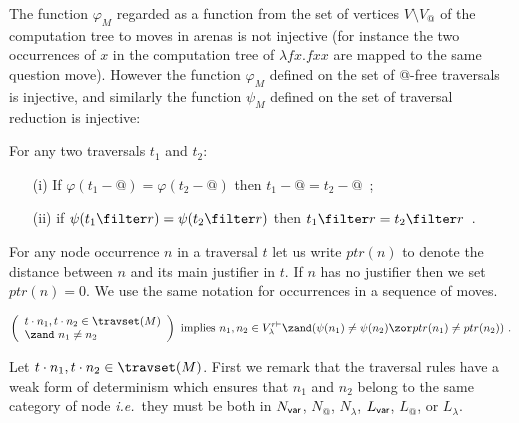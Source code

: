 The function $\varphi_M$ regarded as a function from the set of vertices $V \setminus V_@$ of the computation tree to moves in arenas is not injective (for instance the two occurrences of $x$ in the computation tree of $\lambda f x. f x x$ are mapped to the same question move). However the function $\varphi_M$ defined on the set of @-free traversals is injective, and similarly the function $\psi_M$ defined on the set of traversal reduction is injective:
\begin{lemma}
\label{lem:varphiinjective}
For any two traversals $t_1$ and $t_2$:
\begin{itemize}
\item[(i)] If $\varphi (t_1 - @ ) = \varphi (t_2 - @ )$ then $t_1-@ =t_2 -@$\ ;
\item[(ii)] if $\psi (t_1 \filter r ) = \psi (t_2 \filter r )$ then $t_1\filter r = t_2\filter r$\ .
\end{itemize}
\end{lemma}
For any node occurrence $n$ in a traversal $t$ let us write $ptr(n)$ to denote the distance between $n$ and its main justifier in $t$. If $n$ has no justifier then we set $ptr(n)=0$. We use the same notation for occurrences in a sequence of moves.

\begin{lemma}
\label{lem:varphiinjective:prelem}
\begin{equation*}
\left(
  \begin{array}{ll}
    t \cdot n_1, t \cdot n_2 \in \travset(M) \\
    \zand\ n_1 \neq n_2
  \end{array}
\right)
 \mbox{ implies } n_1,n_2 \in V^{r\vdash}_{\lambda} \zand ( \psi(n_1) \neq \psi(n_2) \zor ptr(n_1) \neq ptr(n_2) ) \ .
 \end{equation*}
\end{lemma}
\proof Let $t \cdot n_1, t \cdot n_2 \in \travset(M)$. First we
remark that the traversal rules have a weak form of determinism
which ensures that $n_1$ and $n_2$ belong to the same category of
node {\it i.e.}\ they must be both in $N_{\sf var}$, $N_@$,
$N_\lambda$, $L_{\sf var}$, $L_@$, or $L_\lambda$.

